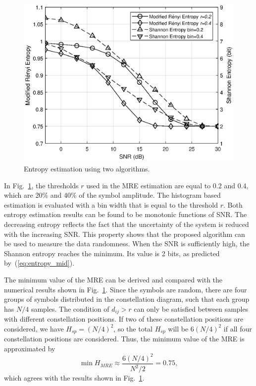 \documentclass[12pt, draftclsnofoot, onecolumn]{IEEEtran}
\begin{document}
\begin{figure}[ht]
\centering
\includegraphics[width=3.1 in]{pic/MRE-k.eps}
\caption{Entropy estimation using two algorithms.}
\label{fig:MRE} 
\end{figure}

In Fig.~\ref{fig:MRE}, the thresholds \(r\) used in the MRE estimation are equal to 0.2 and 0.4, which are 20\% and 40\% of the symbol amplitude. 
The histogram based estimation is evaluated with a bin width that is equal to the threshold \(r\).
Both entropy estimation results can be found to be monotonic functions of SNR.
The decreasing entropy reflects the fact that the uncertainty of the system is reduced with the increasing SNR.
This property shows that the proposed algorithm can be used to measure the data randomness.
When the SNR is sufficiently high, the Shannon entropy reaches the minimum. 
Its value is 2 bits, as predicted by~(\ref{eq:entropy_mid}).

The minimum value of the MRE can be derived and compared with the numerical results shown in Fig.~\ref{fig:MRE}.
Since the symbols are random, there are four groups of symbols distributed in the constellation diagram, such that each group has \(N/4\) samples.
The condition of $d_{ij}>r$ can only be satisfied between samples with different constellation positions.
If two of these constellation positions are considered, we have $H_{sp} = (N/4)^2$, so the total $H_{sp}$ will be $6 (N/4)^2$ if all four constellation positions are considered.
Thus, the minimum value of the MRE is approximated by
\begin{equation}
\min{H_{MRE}} \approx \frac{ 6 \left(N/4\right)^2}{N^2/2}=0.75,
\label{eq:adEntQPSK}
\end{equation}
which agrees with the results shown in Fig.~\ref{fig:MRE}.
\end{document}
